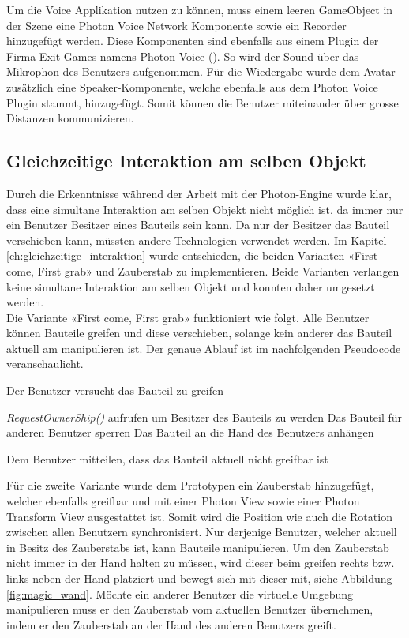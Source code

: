 \noindent Um die Voice Applikation nutzen zu können, muss einem leeren GameObject in der Szene eine \grqq Photon Voice Network\grqq{} Komponente sowie ein \grqq Recorder\grqq{} hinzugefügt werden. Diese Komponenten sind ebenfalls aus einem Plugin der Firma Exit Games namens Photon Voice (\cite{noauthor_photon_2019-1}). So wird der Sound über das Mikrophon des Benutzers aufgenommen. Für die Wiedergabe wurde dem Avatar zusätzlich eine \grqq Speaker\grqq{}-Komponente, welche ebenfalls aus dem Photon Voice Plugin stammt, hinzugefügt. Somit können die Benutzer miteinander über grosse Distanzen kommunizieren. 

\subsection{Gleichzeitige Interaktion am selben Objekt}
\label{ch:gleichzeitige_interaktion_realisierung}

Durch die Erkenntnisse während der Arbeit mit der Photon-Engine wurde klar, dass eine simultane Interaktion am selben Objekt nicht möglich ist, da immer nur ein Benutzer Besitzer eines Bauteils sein kann. Da nur der Besitzer das Bauteil verschieben kann, müssten andere Technologien verwendet werden. Im Kapitel \ref{ch:gleichzeitige_interaktion} wurde entschieden, die beiden Varianten «First come, First grab» und Zauberstab zu implementieren. Beide Varianten verlangen keine simultane Interaktion am selben Objekt und konnten daher umgesetzt werden. \\

\noindent Die Variante «First come, First grab» funktioniert wie folgt. Alle Benutzer können Bauteile greifen und diese verschieben, solange kein anderer das Bauteil aktuell am manipulieren ist. Der genaue Ablauf ist im nachfolgenden Pseudocode veranschaulicht.

\begin{algorithm}
	Der Benutzer versucht das Bauteil zu greifen\;
	 {
		\textit{RequestOwnerShip()} aufrufen um Besitzer des Bauteils zu werden\;
		Das Bauteil für anderen Benutzer sperren\;
		Das Bauteil an die Hand des Benutzers anhängen\;
		
	}{
		Dem Benutzer mitteilen, dass das Bauteil aktuell nicht greifbar ist\;	
	}
\end{algorithm}

Für die zweite Variante wurde dem Prototypen ein Zauberstab hinzugefügt, welcher ebenfalls greifbar und mit einer Photon View sowie einer Photon Transform View ausgestattet ist. Somit wird die Position wie auch die Rotation zwischen allen Benutzern synchronisiert. Nur derjenige Benutzer, welcher aktuell in Besitz des Zauberstabs ist, kann Bauteile manipulieren. Um den Zauberstab nicht immer in der Hand halten zu müssen, wird dieser beim greifen rechts bzw. links neben der Hand platziert und bewegt sich mit dieser mit, siehe Abbildung \ref{fig:magic_wand}. Möchte ein anderer Benutzer die virtuelle Umgebung manipulieren muss er den Zauberstab vom aktuellen Benutzer übernehmen, indem er den Zauberstab an der Hand des anderen Benutzers greift.

